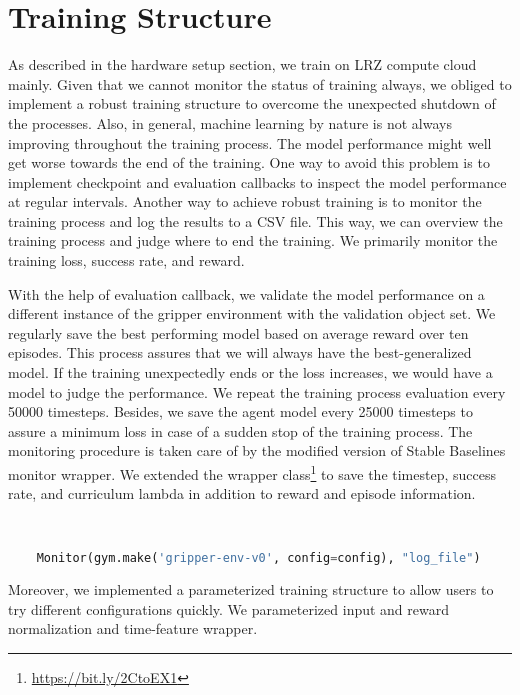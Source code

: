 \section{Training Structure}

As described in the hardware setup section, we train on LRZ compute cloud mainly. Given that we cannot monitor the status of training always, we obliged to implement a robust training structure to overcome the unexpected shutdown of the processes. Also, in general, machine learning by nature is not always improving throughout the training process. The model performance might well get worse towards the end of the training. One way to avoid this problem is to implement checkpoint and evaluation callbacks to inspect the model performance at regular intervals. Another way to achieve robust training is to monitor the training process and log the results to a CSV file. This way, we can overview the training process and judge where to end the training. We primarily monitor the training loss, success rate, and reward.

With the help of evaluation callback, we validate the model performance on a different instance of the gripper environment with the validation object set. We regularly save the best performing model based on average reward over ten episodes. This process assures that we will always have the best-generalized model. If the training unexpectedly ends or the loss increases, we would have a model to judge the performance. We repeat the training process evaluation every 50000 timesteps. Besides, we save the agent model every 25000 timesteps to assure a minimum loss in case of a sudden stop of the training process.
The monitoring procedure is taken care of by the modified version of Stable Baselines monitor wrapper.  We extended the wrapper class\footnote{\url{https://bit.ly/2CtoEX1}} to save the timestep, success rate, and curriculum lambda in addition to reward and episode information.


\begin{lstlisting}[language=Python, caption= Integration of monitor wrapper helper function, label=code:monitor]


    Monitor(gym.make('gripper-env-v0', config=config), "log_file")


\end{lstlisting}

Moreover, we implemented a parameterized training structure to allow users to try different configurations quickly. We parameterized input and reward normalization and time-feature wrapper.
